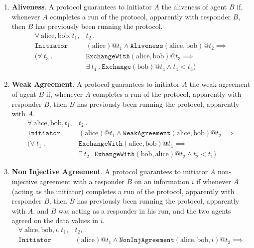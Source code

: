 \begin{enumerate}
    \item \textbf{Aliveness}. A protocol guarantees to initiator $A$ the aliveness of agent $B$ if, whenever $A$ completes a run of the protocol, apparently with responder $B$, then $B$ has previously been running the protocol.
        \begin{align*}
            \forall \ \text{alice}, \text{bob}, t_1, & t_2 \ . \\
            \mathtt{Initiator}&(\text{alice}) @t_1\land \mathtt{Aliveness}(\text{alice}, \text{bob}) @ t_2 \implies \\  
            ( \forall \  t_3 \ . \ &\mathtt{ExchangeWith}(\text{alice}, \text{bob}) @ t_3 \implies \\   
            &\exists \ t_4 \ . \ \mathtt{Exchange}(\text{bob}) @ t_4 \land t_4 < t_3)
        \end{align*}
    \item \textbf{Weak Agreement}. A protocol guarantees to initiator $A$ the weak agreement of agent $B$ if, whenever $A$ completes a run of the protocol, apparently with responder $B$, then $B$ has previously been running the protocol, apparently with $A$.
        \begin{align*}
            \forall \ \text{alice}, \text{bob}, t_1, & t_2 \ . \\
            \mathtt{Initiator}&(\text{alice}) @t_1\land \mathtt{WeakAgreement}(\text{alice}, \text{bob}) @ t_2 \implies \\
            ( \forall \  t_1 \ . \ &\mathtt{ExchangeWith}(\text{alice}, \text{bob}) @ t_1 \implies \\     
            &\exists \ t_2 \ . \ \mathtt{ExhangeWith}(\text{bob}, \text{alice}) @ t_2 \land t_2 < t_1)
        \end{align*}
    \item \textbf{Non Injective Agreement}. A protocol guarantees to initiator $A$ non-injective agreement with a responder $B$ on an information $i$ if whenever $A$ (acting as the initiator) completes a run of the protocol, apparently with responder $B$, then $B$ has previously been running the protocol, apparently with $A$, and $B$ was acting as a responder in his run, and the two agents agreed on the data values in $i$.
        \begin{align*}
            \forall \ \text{alice}, \text{bob}, i, t_1, & t_2, \ . \\
            \mathtt{Initiator}&(\text{alice}) @t_1\land \mathtt{NonInjAgreement}(\text{alice}, \text{bob}, i) @ t_2 \implies \\

\end{align*}
\end{enumerate}
